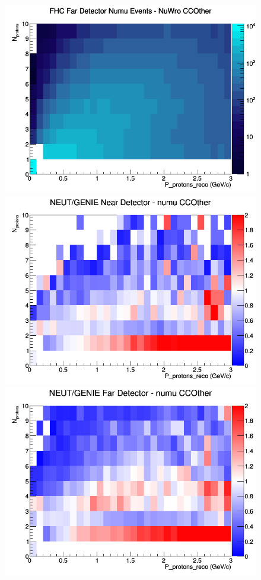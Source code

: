\documentclass[12pt]{article}
\begin{document}
\begin{figure}[h]
\endminipage
{}
\includegraphics[width=\linewidth]{eff_N_P/FGT/protons/CCOther_FHC_FD_numu_N_P_NuWro.png}
\endminipage
\newline
{}
\includegraphics[width=\linewidth]{eff_N_P/FGT/protons/ratios/CCOther_NEUT_GENIE_numu_near_N_P.png}
\endminipage
{}
\includegraphics[width=\linewidth]{eff_N_P/FGT/protons/ratios/CCOther_NEUT_GENIE_numu_far_N_P.png}

\end{figure}
\end{document}
